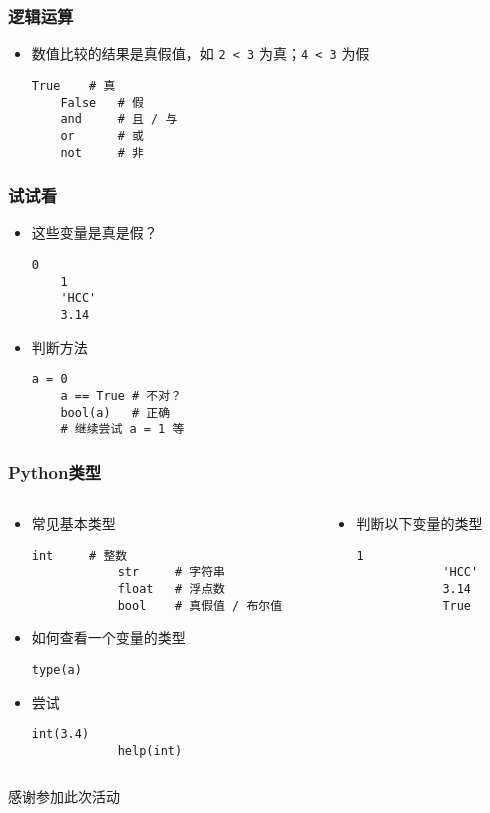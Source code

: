 \begin{frame} [fragile]
	\frametitle{逻辑运算}
	\begin{itemize}
	\item 数值比较的结果是真假值，如 \texttt{2 < 3} 为真；\texttt{4 < 3} 为假
	\begin{lstlisting}[style=pythonstyle, gobble=4, texcl,
						basicstyle=\linespread{1.5}\ttfamily]
	True	# 真
	False	# 假
	and		# 且 / 与
	or		# 或
	not		# 非
	\end{lstlisting}
	\end{itemize}
\end{frame}

\begin{frame} [fragile]
	\frametitle{试试看}
	\begin{itemize}
	\item 这些变量是真是假？
	\begin{lstlisting}[style=pythonstyle, gobble=4]
	0
	1
	'HCC'
	3.14
	\end{lstlisting}
	\item 判断方法
	\begin{lstlisting}[style=pythonstyle, gobble=4, texcl]
	a = 0
	a == True # 不对？
	bool(a)   # 正确
	# 继续尝试 a = 1 等
	\end{lstlisting}
	\end{itemize}
\end{frame}

\begin{frame} [fragile]
	\frametitle{Python类型}
	\begin{columns}[T]
		\begin{column}[T]{.6\textwidth}
			\begin{itemize}
			\item 常见基本类型
			\begin{lstlisting}[style=pythonstyle, gobble=12, texcl]
			int		# 整数
			str		# 字符串
			float	# 浮点数
			bool	# 真假值 / 布尔值
			\end{lstlisting}
			\item 如何查看一个变量的类型
			\begin{lstlisting}[style=pythonstyle, gobble=12, texcl]
			type(a)
			\end{lstlisting}
			\item 尝试
			\begin{lstlisting}[style=pythonstyle, gobble=12, texcl]
			int(3.4)
			help(int)
			\end{lstlisting}
			\end{itemize}
		\end{column}
		\begin{column}[T]{.4\textwidth}
			\begin{itemize}
			\item 判断以下变量的类型
			\begin{lstlisting}[style=pythonstyle, gobble=12, texcl]
			1
			'HCC'
			3.14
			True
			\end{lstlisting}
			\end{itemize}
		\end{column}
	\end{columns}
\end{frame}

\PreLastFrame
\begin{frame}
	\centerline{\fontsize{32}{32}\selectfont 感谢参加此次活动}
\end{frame}

\newpage



